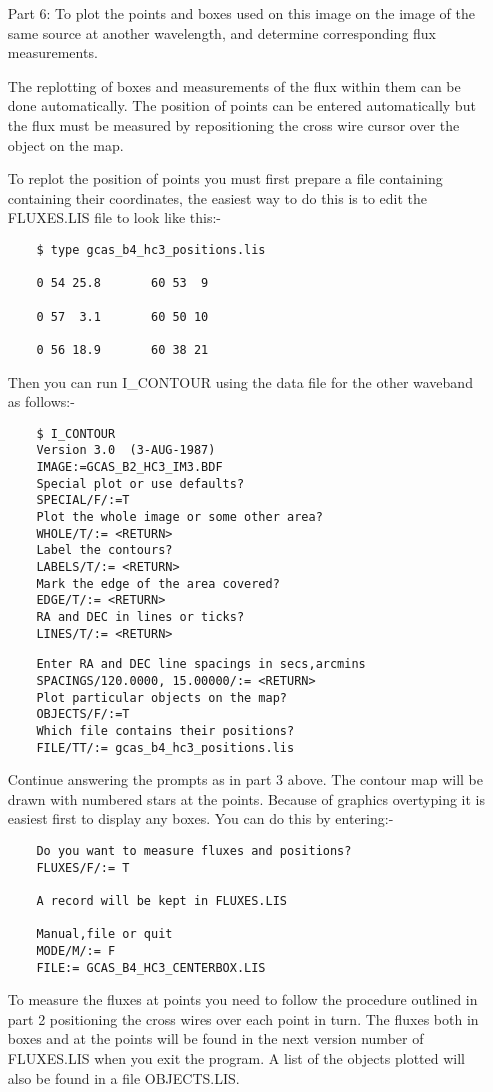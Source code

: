 \begin{itemize}
\item [Part 6:] To plot the points and boxes used on this image on the image of
the same source at another wavelength, and determine corresponding flux
measurements.

The replotting of boxes and measurements of the flux within them can be done
automatically. The position of points can be entered automatically but the
flux must be measured by repositioning the cross wire cursor over the object
on the map.

To replot the position of points you must first prepare a file containing
containing their coordinates, the easiest way to do this is to edit the
FLUXES.LIS file to look like this:-

\begin{verbatim}
    $ type gcas_b4_hc3_positions.lis

    0 54 25.8       60 53  9

    0 57  3.1       60 50 10

    0 56 18.9       60 38 21
\end{verbatim}

Then you can run I\_CONTOUR using the data file for the other waveband as
follows:-

\begin{verbatim}
    $ I_CONTOUR
    Version 3.0  (3-AUG-1987)
    IMAGE:=GCAS_B2_HC3_IM3.BDF
    Special plot or use defaults?
    SPECIAL/F/:=T
    Plot the whole image or some other area?
    WHOLE/T/:= <RETURN>
    Label the contours?
    LABELS/T/:= <RETURN>
    Mark the edge of the area covered?
    EDGE/T/:= <RETURN>
    RA and DEC in lines or ticks?
    LINES/T/:= <RETURN>
\end{verbatim}
\pagebreak
\begin{verbatim}
    Enter RA and DEC line spacings in secs,arcmins
    SPACINGS/120.0000, 15.00000/:= <RETURN>
    Plot particular objects on the map?
    OBJECTS/F/:=T
    Which file contains their positions?
    FILE/TT/:= gcas_b4_hc3_positions.lis
\end{verbatim}
Continue answering the prompts as in part 3 above. The contour map will be
drawn with numbered stars at the points. Because of graphics overtyping it is
easiest first to display any boxes. You can do this by entering:-
\begin{verbatim}
    Do you want to measure fluxes and positions?
    FLUXES/F/:= T

    A record will be kept in FLUXES.LIS

    Manual,file or quit
    MODE/M/:= F
    FILE:= GCAS_B4_HC3_CENTERBOX.LIS
\end{verbatim}

To measure the fluxes at points you need to follow the procedure outlined
in part 2 positioning the cross wires over each point in turn. The fluxes both
in boxes and at the points will be found in the next version number of
FLUXES.LIS when you exit the program. A list of the objects plotted will also
be found in a file OBJECTS.LIS.
\end{itemize}


